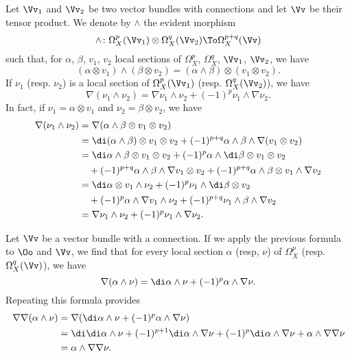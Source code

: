 \begin{para}
  Let $\Vv_1$ and $\Vv_2$ be two vector bundles with connections and let $\Vv$
  be their tensor product. We denote by $\wedge$ the evident morphism
  \[
  \wedge\colon\Omega_X^p(\Vv_1)\otimes\Omega_X^q(\Vv_2)\To\Omega_X^{p+q}(\Vv)
  \]
  such that, for $\alpha$, $\beta$, $v_1$, $v_2$ local sections of
  $\Omega_X^p$, $\Omega_X^q$, $\Vv_1$, $\Vv_2$, we have
  \[
  (\alpha\otimes v_1)\wedge(\beta\otimes v_2)
  = (\alpha\wedge\beta)\otimes(v_1\otimes v_2).
  \]
  If $\nu_1$ (resp. $\nu_2$) is a local section of
  $\Omega_X^p(\Vv_1)$ (resp. $\Omega_X^q(\Vv_2)$), we have
  \begin{equation}
    \nabla(\nu_1\wedge\nu_2) =
    \nabla\nu_1\wedge\nu_2 + (-1)^p\nu_1\wedge\nabla\nu_2.
  \end{equation}
  In fact, if $\nu_1=\alpha\otimes v_1$ and $\nu_2=\beta\otimes v_2$, we have
  \begin{align*}
    \nabla(\nu_1\wedge\nu_2) &=
    \nabla(\alpha\wedge\beta\otimes v_1\otimes v_2) \\ &=
    \di(\alpha\wedge\beta)\otimes v_1\otimes v_2 +
    (-1)^{p+q}\alpha\wedge\beta\wedge\nabla(v_1\otimes v_2) \\ &=
    \di\alpha\wedge\beta\otimes v_1\otimes v_2 +
    (-1)^p\alpha\wedge\di\beta\otimes v_1\otimes v_2 \\ &\quad+
    (-1)^{p+q}\alpha\wedge\beta\wedge\nabla v_1 \otimes v_2 +
    (-1)^{p+q}\alpha\wedge\beta\otimes v_1\wedge\nabla v_2 \\ &=
    \di\alpha\otimes v_1\wedge \nu_2 +
    (-1)^p\nu_1\wedge\di\beta\otimes v_2 \\ &\quad+
    (-1)^p\alpha\wedge\nabla v_1\wedge\nu_2 +
    (-1)^{p+q}\nu_1\wedge\beta\wedge\nabla v_2 \\ &=
    \nabla\nu_1\wedge\nu_2 + (-1)^p\nu_1\wedge\nabla\nu_2.
  \end{align*}

  Let $\Vv$ be a vector bundle with a connection.
  If we apply the previous formula to $\Oo$ and $\Vv$, we find that for every
  local section $\alpha$ (resp, $\nu$) of
  $\Omega_X^p$ (resp. $\Omega_X^q(\Vv)$), we have
  \begin{equation}\label{eq:Leibniz_OV}
    \nabla(\alpha\wedge\nu) = \di\alpha\wedge\nu + (-1)^p\alpha\wedge\nabla\nu.
  \end{equation}
  Repeating this formula provides
  \begin{align*}
    \nabla\nabla(\alpha\wedge\nu) &=
    \nabla(\di\alpha\wedge\nu+(-1)^p\alpha\wedge\nabla\nu) \\ &=
    \di\di\alpha\wedge\nu+(-1)^{p+1}\di\alpha\wedge\nabla\nu +
    (-1)^p\di\alpha\wedge\nabla\nu+\alpha\wedge\nabla\nabla\nu \\ &=
    \alpha\wedge\nabla\nabla\nu.
  \end{align*}
\end{para}

